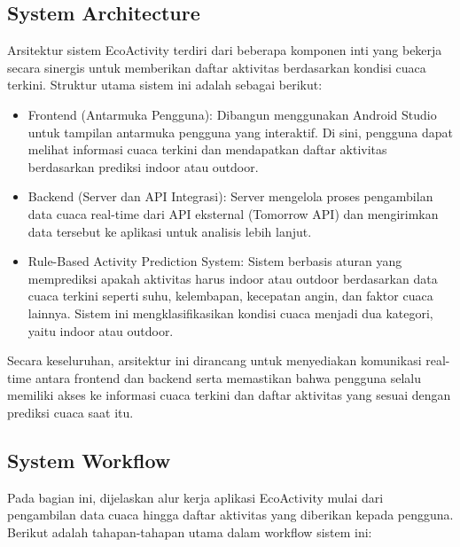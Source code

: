 \documentclass[journal,article,submit,pdftex,moreauthors]{Definitions/mdpi}
\begin{document}
\subsection{System Architecture}

Arsitektur sistem EcoActivity terdiri dari beberapa komponen inti yang bekerja secara sinergis untuk memberikan daftar aktivitas berdasarkan kondisi cuaca terkini. Struktur utama sistem ini adalah sebagai berikut:

\begin{itemize}
    \item Frontend (Antarmuka Pengguna): Dibangun menggunakan Android Studio untuk tampilan antarmuka pengguna yang interaktif. Di sini, pengguna dapat melihat informasi cuaca terkini dan mendapatkan daftar aktivitas berdasarkan prediksi indoor atau outdoor.
    \item Backend (Server dan API Integrasi): Server mengelola proses pengambilan data cuaca real-time dari API eksternal (Tomorrow API) dan mengirimkan data tersebut ke aplikasi untuk analisis lebih lanjut.
    \item Rule-Based Activity Prediction System: Sistem berbasis aturan yang memprediksi apakah aktivitas harus indoor atau outdoor berdasarkan data cuaca terkini seperti suhu, kelembapan, kecepatan angin, dan faktor cuaca lainnya. Sistem ini mengklasifikasikan kondisi cuaca menjadi dua kategori, yaitu indoor atau outdoor.
\end{itemize}

Secara keseluruhan, arsitektur ini dirancang untuk menyediakan komunikasi real-time antara frontend dan backend serta memastikan bahwa pengguna selalu memiliki akses ke informasi cuaca terkini dan daftar aktivitas yang sesuai dengan prediksi cuaca saat itu.


\subsection{System Workflow}

Pada bagian ini, dijelaskan alur kerja aplikasi EcoActivity mulai dari pengambilan data cuaca hingga daftar aktivitas yang diberikan kepada pengguna. Berikut adalah tahapan-tahapan utama dalam workflow sistem ini:
\end{document}
